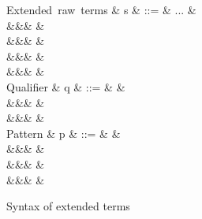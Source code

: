 \begin{figure}[H]
\begin{syntaxfig}
\mbox{Extended raw terms}
&
s
&
::=
&
...
&
\\
&&&
&
\\
&&&
&
\\
&&&
&
\\
&&&
&
\\[2mm]

\mbox{Qualifier}
&
q
&
::=
&
&
\\
&&&
&
\\
&&&
&
\\[2mm]


\mbox{Pattern}
&
p
&
::=
&
&
\\
&&&
&
\\
&&&
\pattNil
&
\\
&&&
&
\\[2mm]
\end{syntaxfig}
\caption{Syntax of extended terms}
\end{figure}
